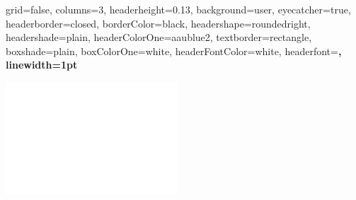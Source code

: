 \documentclass[paperwidth=36in,paperheight=27in,landscape,11pt]{preambles/baposter}
\begin{document}
\begin{poster}{
  grid=false,
  columns=3,
  headerheight=0.13\textheight,
  background=user,
  eyecatcher=true,
  headerborder=closed,
  borderColor=black,
  headershape=roundedright,
  headershade=plain,
  headerColorOne=aaublue2,
  textborder=rectangle,
  boxshade=plain,
  boxColorOne=white,
  headerFontColor=white,
  headerfont=\Large\sf\bf,
  linewidth=1pt
}
{

  \includegraphics[height=0.75\headerheight]{preambles/aau_logo_new_neg}
 
}
\end{poster}
\end{document}
